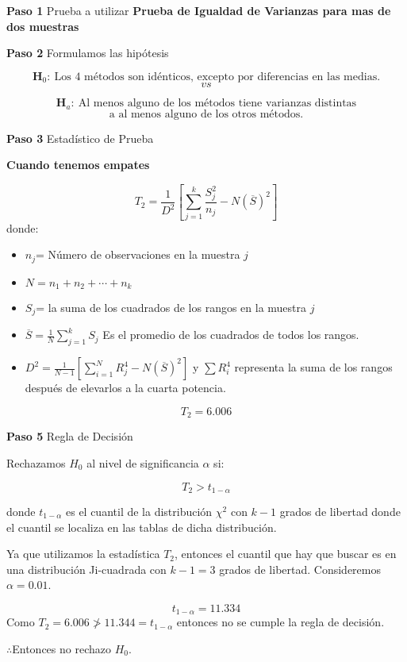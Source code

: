 \documentclass[
  a4paper,
  oneside,
  openany]{book}
\begin{document}
\textbf{Paso 1} Prueba a utilizar \textbf{Prueba de Igualdad de Varianzas para mas de dos muestras}

\textbf{Paso 2} Formulamos las hipótesis

\[\textbf{H}_0: \ \mbox{Los 4 métodos son idénticos, excepto por diferencias en las medias.}\]
\[vs\]

\[\textbf{H}_a:\ \mbox{Al menos alguno de los métodos tiene varianzas distintas}\]
\[\mbox{a al menos alguno de los otros métodos.}\]

\textbf{Paso 3} Estadístico de Prueba

\textbf{Cuando tenemos empates}

\[T_{2}= \frac{1}{D^2}\left[\sum_{j=1}^{k}\frac{S_{j}^2}{n_j}-N(\overline{S})^2\right]\]
donde:

\begin{itemize}
\item
  \(n_{j}\)= Número de observaciones en la muestra \(j\)
\item
  \(N= n_{1}+n_{2}+\cdots+n_{k}\)
\item
  \(S_{j}\)= la suma de los cuadrados de los rangos en la muestra \(j\)
\item
  \(\overline{S}= \frac{1}{N}\sum_{j=1}^{k}S_{j}\) Es el promedio de los cuadrados de todos los rangos.
\item
  \(D^2=\frac{1}{N-1}\left[\sum_{i=1}^{N}R^4_{j}-N(\overline{S})^2\right]\) y \(\sum{R_{i}^4}\) representa la suma de los rangos después de elevarlos a la cuarta potencia.
\end{itemize}

\[T_{2}=6.006\]

\textbf{Paso 5} Regla de Decisión

Rechazamos \(H_0\) al nivel de significancia \(\alpha\) si:

\[T_{2}>t_{1-\alpha}\]

donde \(t_{1-\alpha}\) es el cuantil de la distribución \(\chi^2\) con \(k-1\) grados de libertad donde el cuantil se localiza en las tablas de dicha distribución.

Ya que utilizamos la estadística \(T_2\), entonces el cuantil que hay que buscar es en una distribución Ji-cuadrada con \(k-1=3\) grados de libertad. Consideremos \(\alpha=0.01\).

\[t_{1-\alpha}=11.334\]
Como \(T_2=6.006 \ngtr 11.344=t_{1-\alpha}\) entonces no se cumple la regla de decisión.

\(\therefore\)Entonces no rechazo \(H_0\).
\end{document}
